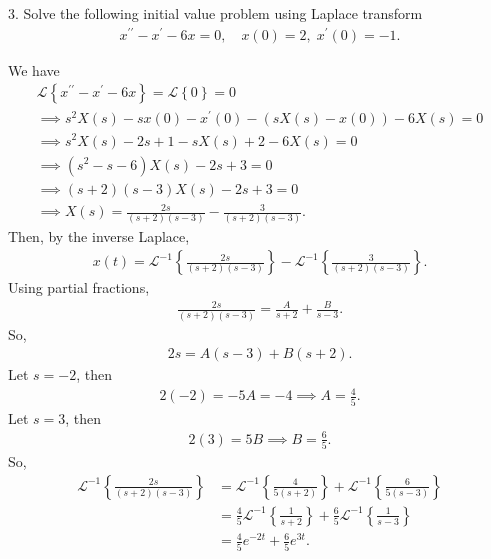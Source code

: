 \documentclass{report}
\begin{document}
    \pagebreak 
    \begin{mdframed}
        3. Solve the following initial value problem using Laplace transform
        \begin{align*}
            x^{\prime\prime} - x^{\prime} - 6x = 0, \quad x(0) = 2,\; x^{\prime}(0) = -1
        .\end{align*}
    \end{mdframed}
    \bigbreak \noindent 
    We have
    \begin{align*}
        \mathcal{L}\left\{x^{\prime\prime} - x^{\prime} - 6x\right\} = \mathcal{L}\left\{0\right\} = 0 \\
        \implies s^{2}X(s) - sx(0) - x^{\prime}(0) - \left(sX(s) - x(0)\right) - 6X(s) = 0 \\
        \implies s^{2}X(s) - 2s + 1 - sX(s) + 2 -6X(s) = 0  \\
        \implies (s^{2}-s-6)X(s) - 2s + 3 = 0 \\
        \implies (s+2)(s-3)X(s) -2s + 3 = 0 \\
        \implies X(s) = \frac{2s}{(s+2)(s-3)} - \frac{3}{(s+2)(s-3)}
    .\end{align*}
    Then, by the inverse Laplace,
    \begin{align*}
        x(t) = \mathcal{L}^{-1}\left\{\frac{2s}{(s+2)(s-3)}\right\} - \mathcal{L}^{-1}\left\{\frac{3}{(s+2)(s-3)}\right\}
    .\end{align*}
    Using partial fractions,
    \begin{align*}
        \frac{2s}{(s+2)(s-3)} = \frac{A}{s+2} + \frac{B}{s-3}
    .\end{align*}
    So,
    \begin{align*}
        2s  =A(s-3) + B(s+2)
    .\end{align*}
    Let $s = -2$, then 
    \begin{align*}
        2(-2) = -5A = -4 \implies A = \frac{4}{5}
    .\end{align*}
    Let $s=3$, then
    \begin{align*}
        2(3) = 5B \implies B = \frac{6}{5}
    .\end{align*}
    So,
    \begin{align*}
        \mathcal{L}^{-1}\left\{\frac{2s}{(s+2)(s-3)}\right\} &= \mathcal{L}^{-1}\left\{\frac{4}{5(s+2)}\right\} + \mathcal{L}^{-1}\left\{\frac{6}{5(s-3)}\right\} \\
                                                             &= \frac{4}{5}\mathcal{L}^{-1}\left\{\frac{1}{s+2}\right\} + \frac{6}{5}\mathcal{L}^{-1}\left\{\frac{1}{s-3}\right\} \\
                                                             &= \frac{4}{5}e^{-2t} + \frac{6}{5}e^{3t}
    .\end{align*}
\end{document}

